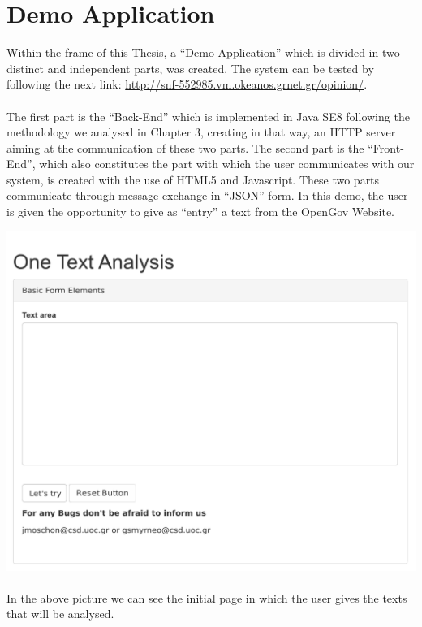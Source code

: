 
\chapter{Demo Application}
Within the frame of this Thesis, a ``Demo Application'' which is divided in two distinct and independent parts, was created. The system can be tested by following the next link: \url{http://snf-552985.vm.okeanos.grnet.gr/opinion/}.\\
\\
The first part is the ``Back-End'' which is implemented in Java SE8 following the methodology we analysed in Chapter 3, creating in that way, an HTTP server aiming at the communication of these two parts. The second part is the ``Front-End'', which also constitutes the part with which the user communicates with our system, is created with the use of HTML5 and Javascript. These two parts communicate through message exchange in ``JSON'' form. In this demo, the user is given the opportunity to give as ``entry'' a text from the OpenGov  Website.

\includegraphics[width=0.9\linewidth]{figure/screens/screen1_vector.pdf}
\\
\\
In the above picture we can see the initial page in which the user gives the texts that will be analysed.\\
\\

